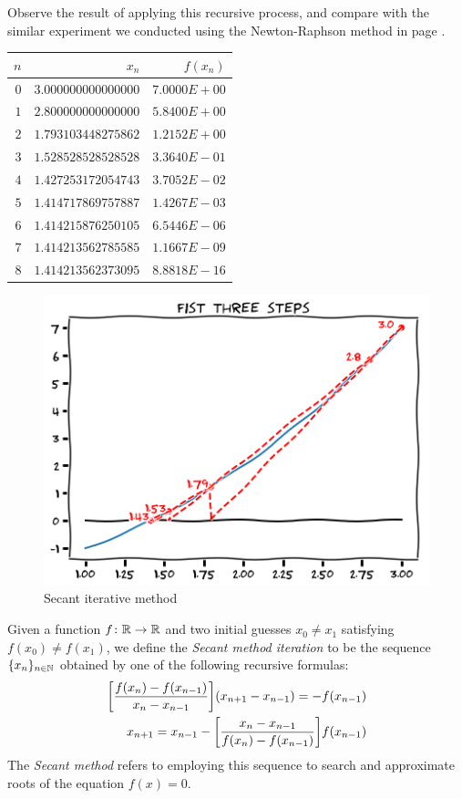 \begin{example}
Observe the result of applying this recursive process, and compare with the similar experiment we conducted using the Newton-Raphson method in page \pageref{table:Newton-Raphson}.
\begin{center}
\begin{tabular}{|r|r|r|} \hline
$n$ & $x_n$ & $f(x_n)$ \\ \hline \hline
$0$ & $3.000000000000000$ & $7.0000E+00$ \\ \hline
$1$ & $2.800000000000000$ & $5.8400E+00$ \\ \hline
$2$ & $1.793103448275862$ & $1.2152E+00$ \\ \hline
$3$ & $1.528528528528528$ & $3.3640E-01$ \\ \hline
$4$ & $1.427253172054743$ & $3.7052E-02$ \\ \hline
$5$ & $1.414717869757887$ & $1.4267E-03$ \\ \hline
$6$ & $1.414215876250105$ & $6.5446E-06$ \\ \hline
$7$ & $1.414213562785585$ & $1.1667E-09$ \\ \hline
$8$ & $1.414213562373095$ & $8.8818E-16$ \\ \hline
\end{tabular}
\end{center}
\begin{figure}[ht!]
\includegraphics[width=0.6\linewidth]{images/secant.png}
\caption{Secant iterative method}\label{figure:SecantMethod}
\end{figure}
\end{example}

\begin{definition}\label{def:SecantMethod}
Given a function $f \colon \mathbb{R} \to \mathbb{R}$ and two initial guesses $x_0 \neq x_1$ satisfying $f(x_0) \neq f(x_1)$, we define the \emph{Secant method iteration} to be the sequence $\{ x_n \}_{n \in \mathbb{N}}$ obtained by one of the following recursive formulas:
\begin{equation}\label{equation:SecantMethod}\index{Secant method!iteration}
\begin{split}
\bigg[\frac{f(x_n) - f(x_{n-1})}{x_n - x_{n-1}}\bigg] (x_{n+1} - x_{n-1}) = - f(x_{n-1}) \\
x_{n+1} = x_{n-1} - \bigg[ \frac{x_n - x_{n-1}}{f(x_n) - f(x_{n-1})} \bigg] f(x_{n-1})
\end{split}
\end{equation}
The \emph{Secant method} refers to employing this sequence to search and approximate roots of the equation $f(x)=0$.
\end{definition}